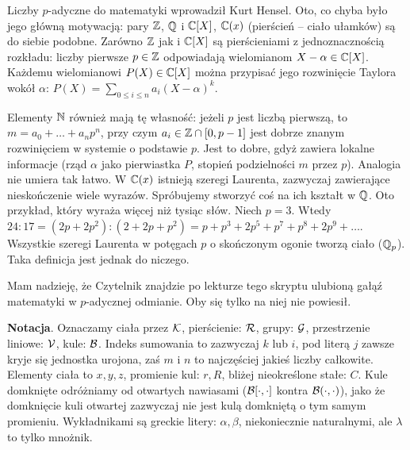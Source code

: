 Liczby $p$-adyczne do matematyki wprowadził Kurt Hensel.
Oto, co chyba było jego główną motywacją: pary $\mathbb Z$, $\mathbb Q$ i $\mathbb C[X]$, $\mathbb C(x)$ (pierścień -- ciało ułamków) są do siebie podobne.
Zarówno $\mathbb Z$ jak i $\mathbb C[X]$ są pierścieniami z jednoznacznością rozkładu: liczby pierwsze $p \in \mathbb Z$ odpowiadają wielomianom $X - \alpha \in \mathbb C[X]$.
Każdemu wielomianowi $P(X) \in \mathbb C[X]$ można przypisać jego rozwinięcie Taylora wokół $\alpha$: $P(X) = \sum_{0 \le i \le n} a_i (X - \alpha)^k$.

Elementy $\mathbb N$ również mają tę własność: jeżeli $p$ jest liczbą pierwszą, to $m = a_0 + \ldots + a_n p^n$, przy czym $a_i \in \mathbb Z \cap [0, p-1]$ jest dobrze znanym rozwinięciem w systemie o podstawie $p$.
Jest to dobre, gdyż zawiera lokalne informacje (rząd $\alpha$ jako pierwiastka $P$, stopień podzielności $m$ przez $p$).
Analogia nie umiera tak łatwo. 
W $\mathbb C(x)$ istnieją szeregi Laurenta, zazwyczaj zawierające nieskończenie wiele wyrazów.
Spróbujemy stworzyć coś na ich kształt w $\mathbb Q$.
Oto przykład, który wyraża więcej niż tysiąc słów.
Niech $p = 3$.
Wtedy $24 : 17 = (2p+2p^2) : (2+2p+p^2) = p + p^3 + 2p^5 + p^7 + p^8 + 2p^9 + \ldots$.
Wszystkie szeregi Laurenta w potęgach $p$ o skończonym ogonie tworzą ciało ($\mathbb Q_p$).
Taka definicja jest jednak do niczego.

Mam nadzieję, że Czytelnik znajdzie po lekturze tego skryptu ulubioną gałąź matematyki w $p$-adycznej odmianie.
Oby się tylko na niej nie powiesił.

\textbf{Notacja}.
Oznaczamy ciała przez $\mathcal K$, pierścienie: $\mathcal R$, grupy: $\mathcal G$, przestrzenie liniowe: $\mathcal V$, kule: $\mathcal B$.
Indeks sumowania to zazwyczaj $k$ lub $i$, pod literą $j$ zawsze kryje się jednostka urojona, zaś $m$ i $n$ to najczęściej jakieś liczby całkowite.
Elementy ciała to $x, y, z$, promienie kul: $r, R$, bliżej nieokreślone stałe: $C$.
Kule domknięte odróżniamy od otwartych nawiasami ($\mathcal B[\cdot, \cdot]$ kontra $\mathcal B(\cdot, \cdot)$), jako że domknięcie kuli otwartej zazwyczaj nie jest kulą domkniętą o tym samym promieniu.
Wykładnikami są greckie litery: $\alpha, \beta$, niekoniecznie naturalnymi, ale $\lambda$ to tylko mnożnik.


